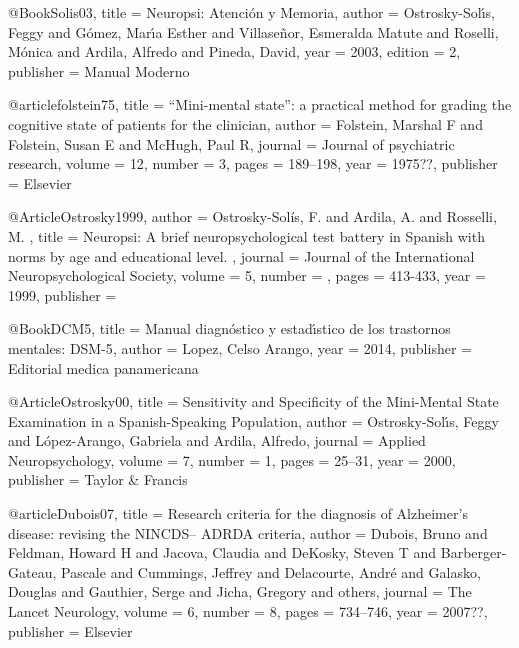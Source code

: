 @Book{Solis03,
    title     = {Neuropsi: {A}tenci{\'o}n y {M}emoria},
    author    = {Ostrosky-Sol{\'\i}s, Feggy 
                 and G{\'o}mez, Mar{\'\i}a Esther 
                 and Villase{\~n}or, Esmeralda Matute 
                 and Roselli, M{\'o}nica 
                 and Ardila, Alfredo 
                 and Pineda, David},
    year      = {2003},
    edition   = {2},
    publisher = {Manual {M}oderno}
}

@article{folstein75,
    title   = {{``Mini-mental state”: a practical method for grading the cognitive state of patients 
               for the clinician}},
    author  = {Folstein, Marshal F 
               and Folstein, Susan E 
               and McHugh, Paul R},
    journal = {Journal of psychiatric research},
    volume  = {12},
    number  = {3},
    pages   = {189--198},
    year    = {1975??},
    publisher = {Elsevier}
}

@Article{Ostrosky1999,
  author  = {Ostrosky-Sol\'is, F. and Ardila, A. and Rosselli, M. },
  title   = {Neuropsi: A brief neuropsychological test battery in Spanish with norms by age and educational level. },
  journal = {Journal of the International Neuropsychological Society},
  volume  = {5},
  number  = {},
  pages   = {413-433},
  year    = {1999},
  publisher = {}
}

@Book{DCM5,
    title     = {Manual diagn{\'o}stico y estad{\'\i}stico de los trastornos mentales: DSM-5},
    author    = {Lopez, Celso Arango},
    year      = {2014},
    publisher = {Editorial medica panamericana}
}

@Article{Ostrosky00,
    title   = {Sensitivity and {S}pecificity of the {M}ini-{M}ental {S}tate {E}xamination in a 
               {S}panish-{S}peaking {P}opulation},
    author  = {Ostrosky-Sol{\'\i}s, Feggy 
               and L{\'o}pez-Arango, Gabriela 
               and Ardila, Alfredo},
    journal = {Applied {N}europsychology},
    volume  = {7},
    number  = {1},
    pages   = {25--31},
    year    = {2000},
    publisher = {Taylor \& Francis}
}

@article{Dubois07,
    title   = {{Research criteria for the diagnosis of Alzheimer's disease: revising the NINCDS--
               ADRDA criteria}},
    author  = {Dubois, Bruno 
               and Feldman, Howard H 
               and Jacova, Claudia 
               and DeKosky, Steven T 
               and Barberger-Gateau, Pascale 
               and Cummings, Jeffrey 
               and Delacourte, Andr{\'e} 
               and Galasko, Douglas 
               and Gauthier, Serge 
               and Jicha, Gregory 
               and others},
    journal = {The Lancet Neurology},
    volume  = {6},
    number  = {8},
    pages   = {734--746},
    year    = {2007??},
    publisher = {Elsevier}
}

